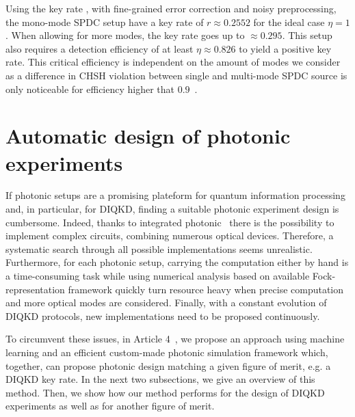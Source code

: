 Using the key rate , with fine-grained error correction and noisy preprocessing, the mono-mode SPDC setup have a key rate of $r\approx 0.2552$ for the ideal case $\eta=1$. 
When allowing for more modes, the key rate goes up to $\approx 0.295$.
This setup also requires a detection efficiency of at least $\eta\approx 0.826$ to yield a positive key rate.
This critical efficiency is independent on the amount of modes we consider as a difference in CHSH violation between single and multi-mode SPDC source is only noticeable for efficiency higher that $0.9$~\cite{Vivoli2015b}.


%

\section{Automatic design of photonic experiments}

If photonic setups are a promising plateform for quantum information processing and, in particular, for DIQKD, finding a suitable photonic experiment design is cumbersome.
Indeed, thanks to integrated photonic~\cite{Pelucchi2021} there is the possibility to implement complex circuits, combining numerous optical devices.
Therefore, a systematic search through all possible implementations seems unrealistic.
Furthermore, for each photonic setup, carrying the computation either by hand is a time-consuming task while using numerical analysis based on available Fock-representation framework quickly turn resource heavy when precise computation and more optical modes are considered.
Finally, with a constant evolution of DIQKD protocols, new implementations need to be proposed continuously.

To circumvent these issues, in Article 4~\cite{Valcarce2022b}, we propose an approach using machine learning and an efficient custom-made photonic simulation framework which, together, can propose photonic design matching a given figure of merit, e.g. a DIQKD key rate. 
In the next two subsections, we give an overview of this method.
Then, we show how our method performs for the design of DIQKD experiments as well as for another figure of merit.

